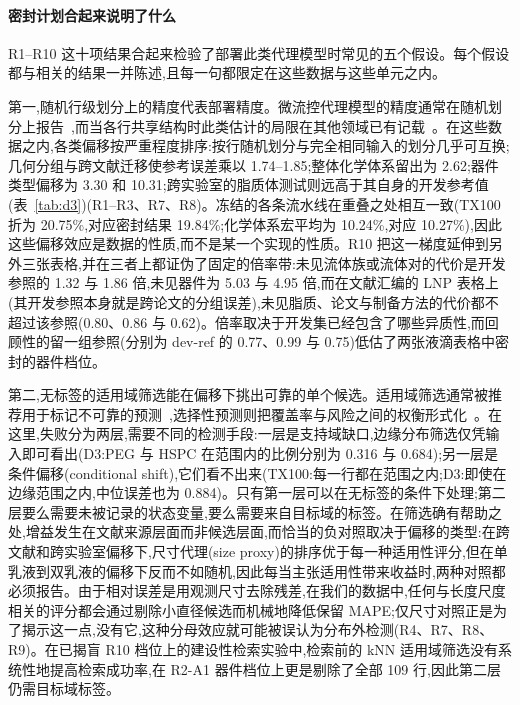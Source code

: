 \documentclass[11pt,a4paper]{ctexart}
\begin{document}
\paragraph{密封计划合起来说明了什么} R1--R10 这十项结果合起来检验了部署此类代理模型时常见的五个假设。每个假设都与相关的结果一并陈述,且每一句都限定在这些数据与这些单元之内。

第一,随机行级划分上的精度代表部署精度。微流控代理模型的精度通常在随机划分上报告~\cite{lashkaripour2021,lashkaripour2024,chagot2022,samari2025},而当各行共享结构时此类估计的局限在其他领域已有记载~\cite{kapoor2023,sheridan2013,wu2018}。在这些数据之内,各类偏移按严重程度排序:按行随机划分与完全相同输入的划分几乎可互换;几何分组与跨文献迁移使参考误差乘以 1.74--1.85;整体化学体系留出为 2.62;器件类型偏移为 3.30 和 10.31;跨实验室的脂质体测试则远高于其自身的开发参考值(表~\ref{tab:d3})(R1--R3、R7、R8)。冻结的各条流水线在重叠之处相互一致(TX100 折为 20.75\%,对应密封结果 19.84\%;化学体系宏平均为 10.24\%,对应 10.27\%),因此这些偏移效应是数据的性质,而不是某一个实现的性质。R10 把这一梯度延伸到另外三张表格,并在三者上都证伪了固定的倍率带:未见流体族或流体对的代价是开发参照的 1.32 与 1.86 倍,未见器件为 5.03 与 4.95 倍,而在文献汇编的 LNP 表格上(其开发参照本身就是跨论文的分组误差),未见脂质、论文与制备方法的代价都不超过该参照(0.80、0.86 与 0.62)。倍率取决于开发集已经包含了哪些异质性,而回顾性的留一组参照(分别为 dev-ref 的 0.77、0.99 与 0.75)低估了两张液滴表格中密封的器件档位。

第二,无标签的适用域筛选能在偏移下挑出可靠的单个候选。适用域筛选通常被推荐用于标记不可靠的预测~\cite{tropsha2003,netzeva2005,sahigara2012},选择性预测则把覆盖率与风险之间的权衡形式化~\cite{elyaniv2010}。在这里,失败分为两层,需要不同的检测手段:一层是支持域缺口,边缘分布筛选仅凭输入即可看出(D3:PEG 与 HSPC 在范围内的比例分别为 0.316 与 0.684);另一层是条件偏移(conditional shift),它们看不出来(TX100:每一行都在范围之内;D3:即使在边缘范围之内,中位误差也为 0.884)。只有第一层可以在无标签的条件下处理;第二层要么需要未被记录的状态变量,要么需要来自目标域的标签。在筛选确有帮助之处,增益发生在文献来源层面而非候选层面,而恰当的负对照取决于偏移的类型:在跨文献和跨实验室偏移下,尺寸代理(size proxy)的排序优于每一种适用性评分,但在单乳液到双乳液的偏移下反而不如随机,因此每当主张适用性带来收益时,两种对照都必须报告。由于相对误差是用观测尺寸去除残差,在我们的数据中,任何与长度尺度相关的评分都会通过剔除小直径候选而机械地降低保留 MAPE;仅尺寸对照正是为了揭示这一点,没有它,这种分母效应就可能被误认为分布外检测(R4、R7、R8、R9)。在已揭盲 R10 档位上的建设性检索实验中,检索前的 kNN 适用域筛选没有系统性地提高检索成功率,在 R2-A1 器件档位上更是剔除了全部 109 行,因此第二层仍需目标域标签。
\end{document}
